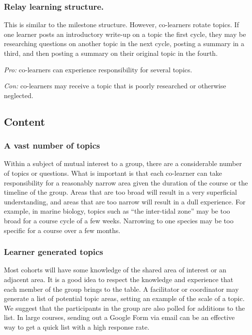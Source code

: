 \subsubsection{Relay learning structure.}

This is similar to the milestone structure. However, co-learners rotate
topics. If one learner posts an introductory write-up on a topic the
first cycle, they may be researching questions on another topic in the
next cycle, posting a summary in a third, and then posting a summary on
their original topic in the fourth.

\emph{Pro:} co-learners can experience responsibility for several
topics.

\emph{Con:} co-learners may receive a topic that is poorly researched or
otherwise neglected.

\subsection{Content}

\subsubsection{A vast number of topics}

Within a subject of mutual interest to a group, there are a considerable
number of topics or questions. What is important is that each co-learner
can take responsibility for a reasonably narrow area given the duration
of the course or the timeline of the group. Areas that are too broad
will result in a very superficial understanding, and areas that are too
narrow will result in a dull experience. For example, in marine biology,
topics such as ``the inter-tidal zone'' may be too broad for a course
cycle of a few weeks. Narrowing to one species may be too specific for a
course over a few months.

\subsubsection{Learner generated topics}

Most cohorts will have some knowledge of the shared area of interest or
an adjacent area. It is a good idea to respect the knowledge and
experience that each member of the group brings to the table. A
facilitator or coordinator may generate a list of potential topic areas,
setting an example of the scale of a topic. We suggest that the
participants in the group are also polled for additions to the list. In
large courses, sending out a Google Form via email can be an effective
way to get a quick list with a high response rate.

